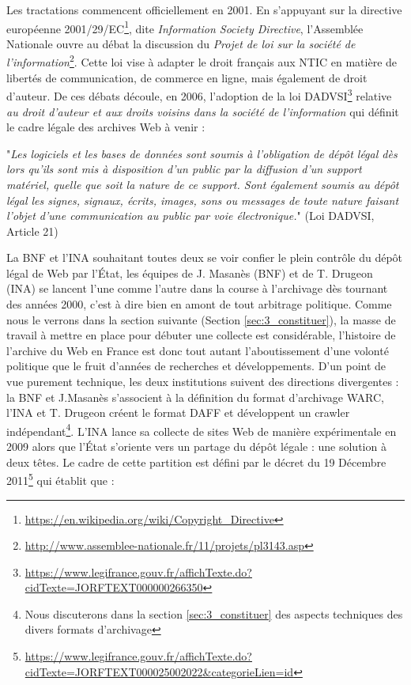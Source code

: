 \documentclass[symmetric,justified,marginals=raggedouter]{tufte-book}
\begin{document}
Les tractations commencent officiellement en 2001. En s'appuyant sur la directive européenne 2001/29/EC\footnote{\url{https://en.wikipedia.org/wiki/Copyright\_Directive}}, dite \textit{Information Society Directive}, l'Assemblée Nationale ouvre au débat la discussion du \textit{Projet de loi sur la société de l'information}\footnote{\url{http://www.assemblee-nationale.fr/11/projets/pl3143.asp}}. Cette loi vise à adapter le droit français aux NTIC en matière de libertés de communication, de commerce en ligne, mais également de droit d'auteur. De ces débats découle, en 2006, l'adoption de la loi DADVSI\footnote{\url{https://www.legifrance.gouv.fr/affichTexte.do?cidTexte=JORFTEXT000000266350}} relative \textit{au droit d'auteur et aux droits voisins dans la société de l'information} qui définit le cadre légale des archives Web à venir :\\

\begin{fullwidth}

"\textit{Les logiciels et les bases de données sont soumis à l’obligation de dépôt légal dès lors qu’ils sont mis à disposition d’un public par la diffusion d’un support matériel, quelle que soit la nature de ce support. Sont également soumis au dépôt légal les signes, signaux, écrits, images, sons ou messages de toute nature faisant l’objet d’une communication au public par voie électronique.}" (Loi DADVSI, Article 21)\\

\end{fullwidth}

\noindent La BNF et l'INA souhaitant toutes deux se voir confier le plein contrôle du dépôt légal de Web par l'État, les équipes de J. Masanès (BNF) et de T. Drugeon (INA) se lancent l'une comme l'autre dans la course à l'archivage dès tournant des années 2000, c'est à dire bien en amont de tout arbitrage politique. Comme nous le verrons dans la section suivante (Section \ref{sec:3_constituer}), la masse de travail à mettre en place pour débuter une collecte est considérable, l'histoire de l'archive du Web en France est donc tout autant l'aboutissement d'une volonté politique que le fruit d'années de recherches et développements. D'un point de vue purement technique, les deux institutions suivent des directions divergentes : la BNF et J.Masanès s'associent à la définition du format d'archivage WARC, l'INA et T. Drugeon créent le format DAFF et développent un crawler indépendant\footnote{Nous discuterons dans la section \ref{sec:3_constituer} des aspects techniques des divers formats d'archivage}. L'INA lance sa collecte de sites Web de manière expérimentale en 2009 alors que l'État s'oriente vers un partage du dépôt légale : une solution à deux têtes. Le cadre de cette partition est défini par le décret du 19 Décembre 2011\footnote{\url{https://www.legifrance.gouv.fr/affichTexte.do?cidTexte=JORFTEXT000025002022&categorieLien=id}} qui établit que :
\end{document}
